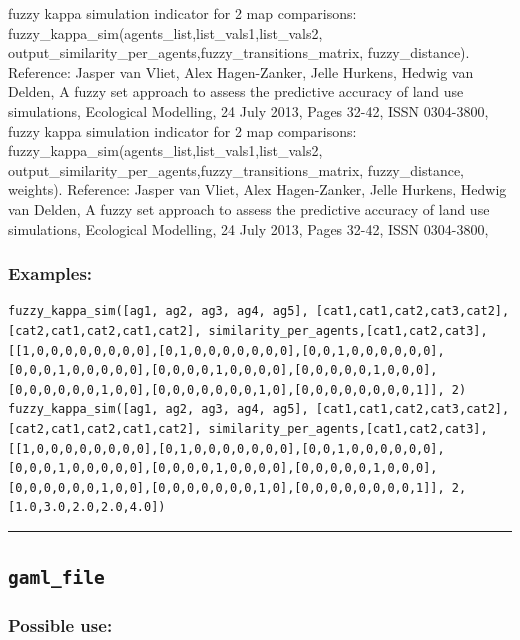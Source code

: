 \documentclass[]{book}
\theoremstyle{definition}
\theoremstyle{definition}
\theoremstyle{definition}
\theoremstyle{remark}
\begin{document}
fuzzy kappa simulation indicator for 2 map comparisons:
fuzzy\_kappa\_sim(agents\_list,list\_vals1,list\_vals2,
output\_similarity\_per\_agents,fuzzy\_transitions\_matrix,
fuzzy\_distance). Reference: Jasper van Vliet, Alex Hagen-Zanker, Jelle
Hurkens, Hedwig van Delden, A fuzzy set approach to assess the
predictive accuracy of land use simulations, Ecological Modelling, 24
July 2013, Pages 32-42, ISSN 0304-3800, fuzzy kappa simulation indicator
for 2 map comparisons:
fuzzy\_kappa\_sim(agents\_list,list\_vals1,list\_vals2,
output\_similarity\_per\_agents,fuzzy\_transitions\_matrix,
fuzzy\_distance, weights). Reference: Jasper van Vliet, Alex
Hagen-Zanker, Jelle Hurkens, Hedwig van Delden, A fuzzy set approach to
assess the predictive accuracy of land use simulations, Ecological
Modelling, 24 July 2013, Pages 32-42, ISSN 0304-3800,

\subsubsection{Examples:}\label{examples-132}

\begin{verbatim}
fuzzy_kappa_sim([ag1, ag2, ag3, ag4, ag5], [cat1,cat1,cat2,cat3,cat2],[cat2,cat1,cat2,cat1,cat2], similarity_per_agents,[cat1,cat2,cat3],[[1,0,0,0,0,0,0,0,0],[0,1,0,0,0,0,0,0,0],[0,0,1,0,0,0,0,0,0],[0,0,0,1,0,0,0,0,0],[0,0,0,0,1,0,0,0,0],[0,0,0,0,0,1,0,0,0],[0,0,0,0,0,0,1,0,0],[0,0,0,0,0,0,0,1,0],[0,0,0,0,0,0,0,0,1]], 2) fuzzy_kappa_sim([ag1, ag2, ag3, ag4, ag5], [cat1,cat1,cat2,cat3,cat2],[cat2,cat1,cat2,cat1,cat2], similarity_per_agents,[cat1,cat2,cat3],[[1,0,0,0,0,0,0,0,0],[0,1,0,0,0,0,0,0,0],[0,0,1,0,0,0,0,0,0],[0,0,0,1,0,0,0,0,0],[0,0,0,0,1,0,0,0,0],[0,0,0,0,0,1,0,0,0],[0,0,0,0,0,0,1,0,0],[0,0,0,0,0,0,0,1,0],[0,0,0,0,0,0,0,0,1]], 2,[1.0,3.0,2.0,2.0,4.0]) 
\end{verbatim}

\begin{center}\rule{0.5\linewidth}{\linethickness}\end{center}

\subsection{\texorpdfstring{\texttt{gaml\_file}}{gaml\_file}}\label{gaml_file}

\subsubsection{Possible use:}\label{possible-use-178}
\end{document}
